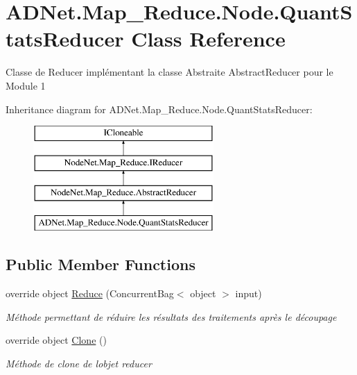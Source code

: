 \hypertarget{class_a_d_net_1_1_map___reduce_1_1_node_1_1_quant_stats_reducer}{}\section{A\+D\+Net.\+Map\+\_\+\+Reduce.\+Node.\+Quant\+Stats\+Reducer Class Reference}
\label{class_a_d_net_1_1_map___reduce_1_1_node_1_1_quant_stats_reducer}


Classe de Reducer implémentant la classe Abstraite Abstract\+Reducer pour le Module 1  


Inheritance diagram for A\+D\+Net.\+Map\+\_\+\+Reduce.\+Node.\+Quant\+Stats\+Reducer\+:\begin{figure}[H]
\begin{center}
\leavevmode
\includegraphics[height=4.000000cm]{class_a_d_net_1_1_map___reduce_1_1_node_1_1_quant_stats_reducer}
\end{center}
\end{figure}
\subsection*{Public Member Functions}
\begin{DoxyCompactItemize}
\item 
override object \hyperlink{class_a_d_net_1_1_map___reduce_1_1_node_1_1_quant_stats_reducer_a315cd41c2ab48fbf409d16389977c679}{Reduce} (Concurrent\+Bag$<$ object $>$ input)
\begin{DoxyCompactList}\small\item\em Méthode permettant de réduire les résultats des traitements après le découpage \end{DoxyCompactList}\item 
override object \hyperlink{class_a_d_net_1_1_map___reduce_1_1_node_1_1_quant_stats_reducer_a3595f4275c71a2d373f12bd74e7f1da4}{Clone} ()
\begin{DoxyCompactList}\small\item\em Méthode de clone de l\textquotesingle{}objet reducer \end{DoxyCompactList}\end{DoxyCompactItemize}


